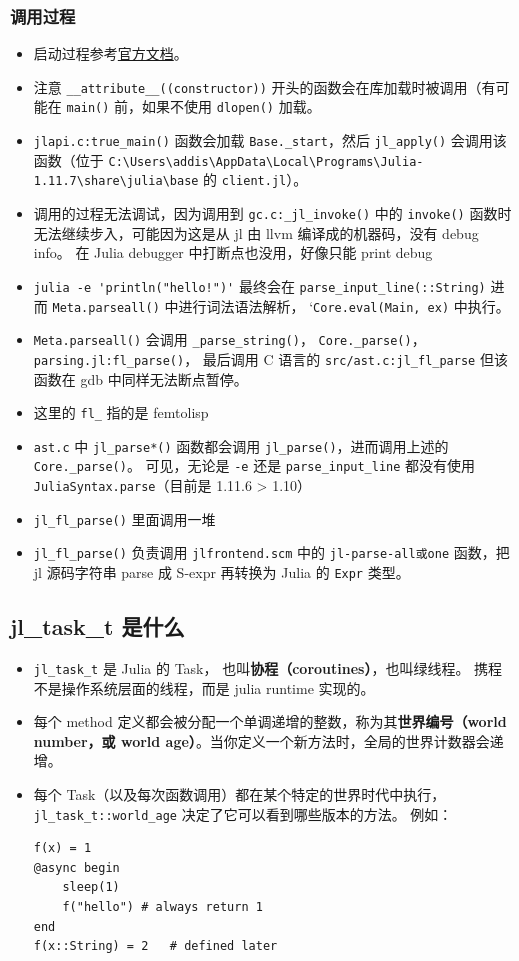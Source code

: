 \subsubsection{调用过程}
\begin{itemize}
\item 启动过程参考\href{https://docs.julialang.org/en/v1/devdocs/init/}{官方文档}。
\item 注意 \verb`__attribute__((constructor))` 开头的函数会在库加载时被调用（有可能在 \verb`main()` 前，如果不使用 \verb`dlopen()` 加载。
\item \verb`jlapi.c:true_main()` 函数会加载 \verb`Base._start`，然后 \verb`jl_apply()` 会调用该函数（位于 \verb`C:\Users\addis\AppData\Local\Programs\Julia-1.11.7\share\julia\base` 的 \verb`client.jl`）。
\item 调用的过程无法调试，因为调用到 \verb`gc.c:_jl_invoke()` 中的 \verb`invoke()` 函数时无法继续步入，可能因为这是从 jl 由 llvm 编译成的机器码，没有 debug info。 在 Julia debugger 中打断点也没用，好像只能 print debug
\item \verb`julia -e 'println("hello!")'` 最终会在 \verb`parse_input_line(::String)` 进而 \verb`Meta.parseall()` 中进行词法语法解析， `\verb`Core.eval(Main, ex)` 中执行。
\item \verb`Meta.parseall()` 会调用 \verb`_parse_string()`， \verb`Core._parse()`， \verb`parsing.jl:fl_parse()`， 最后调用 C 语言的 \verb`src/ast.c:jl_fl_parse` 但该函数在 gdb 中同样无法断点暂停。
\item 这里的 \verb`fl_` 指的是 femtolisp
\item \verb`ast.c` 中 \verb`jl_parse*()` 函数都会调用 \verb`jl_parse()`，进而调用上述的 \verb`Core._parse()`。 可见，无论是 \verb`-e` 还是 \verb`parse_input_line` 都没有使用 \verb`JuliaSyntax.parse`（目前是 1.11.6 > 1.10）
\item \verb`jl_fl_parse()` 里面调用一堆
\item \verb`jl_fl_parse()` 负责调用 \verb`jlfrontend.scm` 中的 \verb`jl-parse-all或one` 函数，把 jl 源码字符串 parse 成 S-expr 再转换为 Julia 的 \verb`Expr` 类型。
\end{itemize}

\subsection{jl_task_t 是什么}
\begin{itemize}
\item \verb`jl_task_t` 是 Julia 的 Task， 也叫\textbf{协程（coroutines）}，也叫绿线程。 携程不是操作系统层面的线程，而是 julia runtime 实现的。
\item 每个 method 定义都会被分配一个单调递增的整数，称为其\textbf{世界编号（world number，或 world age）}。当你定义一个新方法时，全局的世界计数器会递增。
\item 每个 Task（以及每次函数调用）都在某个特定的世界时代中执行， \verb`jl_task_t::world_age` 决定了它可以看到哪些版本的方法。 例如：
\begin{lstlisting}[language=none]
f(x) = 1
@async begin
    sleep(1)
    f("hello") # always return 1
end
f(x::String) = 2   # defined later
\end{lstlisting}
\end{itemize}


